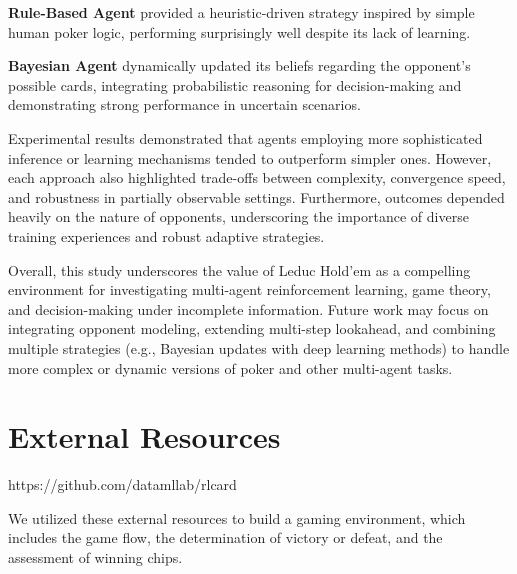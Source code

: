 \documentclass{article}
\begin{document}
    \textbf{Rule-Based Agent} provided a heuristic-driven strategy inspired by simple human poker logic, performing surprisingly well despite its lack of learning.

    \textbf{Bayesian Agent} dynamically updated its beliefs regarding the opponent’s possible cards, integrating probabilistic reasoning for decision-making and demonstrating strong performance in uncertain scenarios.

Experimental results demonstrated that agents employing more sophisticated inference or learning mechanisms tended to outperform simpler ones. However, each approach also highlighted trade-offs between complexity, convergence speed, and robustness in partially observable settings. Furthermore, outcomes depended heavily on the nature of opponents, underscoring the importance of diverse training experiences and robust adaptive strategies.

Overall, this study underscores the value of Leduc Hold’em as a compelling environment for investigating multi-agent reinforcement learning, game theory, and decision-making under incomplete information. Future work may focus on integrating opponent modeling, extending multi-step lookahead, and combining multiple strategies (e.g., Bayesian updates with deep learning methods) to handle more complex or dynamic versions of poker and other multi-agent tasks.

\section*{External Resources}
https://github.com/datamllab/rlcard

We utilized these external resources to build a gaming environment, which includes the game flow, the determination of victory or defeat, and the assessment of winning chips.


\end{document}
